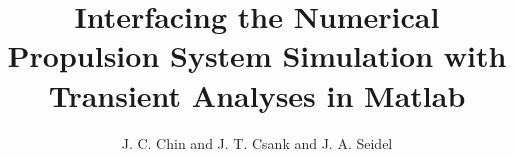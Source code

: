 \documentclass[]             %
{NASA}                       %
\title{Interfacing the Numerical Propulsion System Simulation with Transient Analyses in Matlab}
\author{J. C. Chin and J. T. Csank and J. A. Seidel} %
\begin{document}
\tableofcontents
\listoffigures
\listoftables




\cite{Turbofan}
\cite{NonlinearDynamic}
\cite{MatlabOOP}
\cite{Volume Dynamic}




\end{document}
